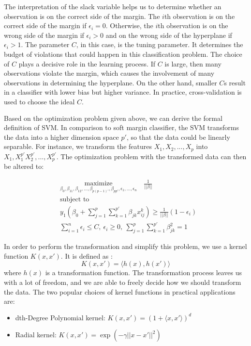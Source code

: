 The interpretation of the slack variable helps us to determine whether an observation is on the correct side of the margin.
The $i$th observation is on the correct side of the margin if $\epsilon_i = 0$. Otherwise, 
the $i$th observation is on the wrong side of the margin if $\epsilon_i > 0$ and on the wrong side of the hyperplane
if $\epsilon_i > 1$. The parameter $C$, in this case, is the tuning parameter. It determines the budget of violations
that could happen in this classification problem. The choice of $C$ plays a decisive role in the learning process.
If $C$ is large, then many observations violate the margin, which causes the involvement of many observations in 
determining the hyperplane. On the other hand, smaller $C$s result in a classifier with lower bias but higher variance.
In practice, cross-validation is used to choose the ideal $C$. 

Based on the optimization problem given above, we can derive the formal definition of SVM. In comparison to 
soft margin classifier, the SVM transforms the data into a higher dimension space $p'$, so that the data could be
linearly separable. For instance, we transform the features $X_1, X_2, ..., X_p$ into $X_1, X_1^{p'} X_2^{p'}, ..., X_p^{p'}$.
The optimization problem with the transformed data can then be altered to\cite{R9}: 

\begin{equation}
    \begin{aligned}
      & \underset{\textstyle {\beta_0, \beta_{11}, \beta_{12}, ..., \beta_{p(p-1)'}, \beta_{pp'}, \epsilon_1, ..., \epsilon_n}}{\text{maximize}} \quad
        \frac 1 {||\beta||}\\
      & \text{subject to} \\
      & y_1(\beta_0 + \sum_{j=1}^p \sum_{k=1}^{p'} \beta_{jk}x_{ij}^k )\geq \frac{1}{||\beta||} (1-\epsilon_i) \\
      & \sum_{i=1}^n\epsilon_i \leq C,\  \epsilon_i \geq 0, \ \sum_{j=1}^p\sum_{k=1}^{p'}\beta_{jk}^2 = 1
    \end{aligned}
\end{equation}

In order to perform the transformation and simplify this problem, we use a kernel function $K(x, x')$. It is defined as \cite{Elements12}:
\begin{equation}
    K(x, x') = \langle h(x), h(x') \rangle
\end{equation}
where $h(x)$ is a transformation function. 
The transformation process leaves us with a lot of freedom, and we are able to freely decide how we should transform the
data. The two popular choices of kernel functions in practical applications are:
\begin{itemize}
    \item dth-Degree Polynomial kernel: $K(x, x') = (1 + \langle x, x' \rangle)^d$
    \item Radial kernel: $K(x, x') = \exp(-\gamma ||x - x'||^2)$
\end{itemize}

